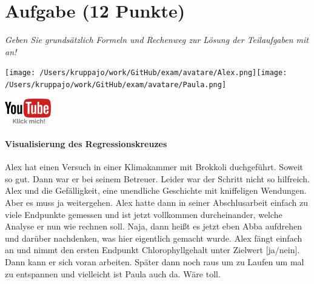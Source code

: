 \documentclass[a4paper, 9pt]{scrartcl}\usepackage[]{graphicx}\usepackage[]{xcolor}
\begin{document}
\clearpage

\section{Aufgabe \hfill (12 Punkte)}

\textit{Geben Sie grundsätzlich Formeln und Rechenweg zur Lösung der Teilaufgaben mit an!} \\[1Ex]
 

 
\begin{minipage}[t]{0.5\textwidth}
\texttt{[image: /Users/kruppajo/work/GitHub/exam/avatare/Alex.png]}\hspace{-4mm}\texttt{[image: /Users/kruppajo/work/GitHub/exam/avatare/Paula.png]}
\end{minipage}
\begin{minipage}[t]{0.5\textwidth}
\hfill
\href{https://youtu.be/kHmfEmU6lrk}{\includegraphics[width = 2cm]{img/youtube}}
\end{minipage}



\paragraph{Visualisierung des Regressionskreuzes}

Alex hat einen Versuch in einer Klimakammer mit Brokkoli duchgeführt. Soweit so gut. Dann war er bei seinem Betreuer. Leider war der Schritt nicht so hilfreich.  Alex und die Gefälligkeit, eine unendliche Geschichte mit kniffeligen Wendungen. Aber es muss ja weitergehen. Alex hatte dann in seiner Abschlusarbeit einfach zu viele Endpunkte gemessen und ist jetzt vollkommen durcheinander, welche Analyse er nun wie rechnen soll. Naja, dann heißt es jetzt eben Abba aufdrehen und darüber nachdenken, was hier eigentlich gemacht wurde. Alex fängt einfach an und nimmt den ersten Endpunkt Chlorophyllgehalt unter Zielwert [ja/nein]. Dann kann er sich voran arbeiten. Später dann noch raus um zu Laufen um mal zu entspannen und vielleicht ist Paula auch da. Wäre toll.

\vspace{1Ex}
\end{document}
